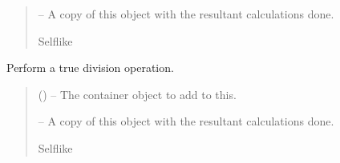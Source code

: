 \documentclass[letterpaper,11pt,english]{sphinxmanual}
\begin{document}
\begin{savenotes}
\begin{fulllineitems}
\begin{savenotes}
\begin{fulllineitems}
\begin{quote}
\begin{description}
\sphinxAtStartPar
{} – A copy of this object with the resultant calculations done.

\sphinxAtStartPar
Self\sphinxhyphen{}like

\end{description}\end{quote}

\end{fulllineitems}\end{savenotes}


\begin{savenotes}\begin{fulllineitems}
\label{\detokenize{code/lezargus.container.parent:lezargus.container.parent.LezargusContainerArithmetic.__pow__}}
\pysigstartsignatures
{}
\pysigstopsignatures
\sphinxAtStartPar
Perform a true division operation.
\begin{quote}\begin{description}
\sphinxAtStartPar
{} () – The container object to add to this.

\sphinxAtStartPar
{} – A copy of this object with the resultant calculations done.

\sphinxAtStartPar
Self\sphinxhyphen{}like

\end{description}\end{quote}

\end{fulllineitems}\end{savenotes}



\end{fulllineitems}
\end{savenotes}
\end{document}
